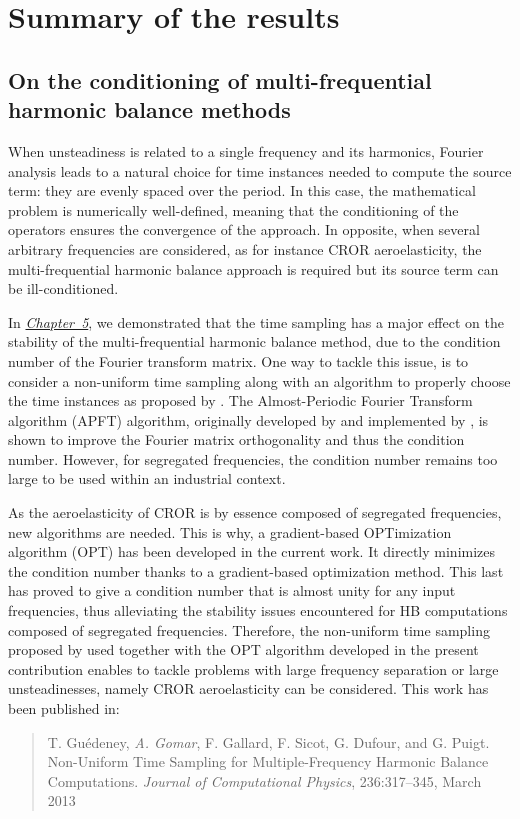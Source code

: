 \section*{Summary of the results}

\subsection*{On the conditioning of multi-frequential harmonic balance methods}

When unsteadiness is related to a single frequency and its
harmonics, Fourier analysis leads to a natural choice for time instances
needed to compute the source term:
they are evenly spaced over the period. In this case, the mathematical
problem is numerically well-defined, meaning that the conditioning of
the operators ensures the convergence of the approach.
In opposite, when several arbitrary frequencies are 
considered, as for instance CROR
aeroelasticity, the multi-frequential harmonic balance approach
is required but its source term can be ill-conditioned.

In \hyperref[cha:limitations_condition_number]{\emph{Chapter~5}},
we demonstrated that the time sampling has a major effect on the
stability of the multi-frequential harmonic balance 
method, due to the condition number of the Fourier
transform matrix. One way to tackle this issue, 
is to consider a non-uniform time sampling
along with an algorithm to properly choose the time instances
as proposed by \citet{ThesisGuedeney}.
The Almost-Periodic Fourier Transform algorithm (APFT) 
algorithm, originally developed by \citet{Kundert1988} and implemented by 
\citet{ThesisGuedeney}, is shown to improve the
Fourier matrix orthogonality and thus the condition number.
However, for segregated frequencies, the condition number
remains too large to be used within an industrial context.

As the aeroelasticity of CROR is by essence
composed of segregated frequencies, new algorithms are needed.
This is why, a gradient-based OPTimization algorithm (OPT) 
has been developed in the current work.
It directly minimizes the condition number thanks to a
gradient-based optimization method. This last has proved to
give a condition number that is almost unity for any input frequencies,
thus alleviating the stability issues encountered for HB
computations composed of segregated frequencies.
Therefore, the non-uniform time sampling proposed by \citet{ThesisGuedeney}
used together with the OPT algorithm 
developed in the present contribution
enables to tackle problems with large frequency 
separation or large unsteadinesses, namely CROR aeroelasticity
can be considered.
This work has been published in:
\begin{quote}
	{\small T. Gu\'edeney, \emph{A. Gomar}, F. Gallard, F. Sicot, G. Dufour, and G. Puigt. 
	Non-Uniform Time Sampling for Multiple-Frequency Harmonic Balance Computations. 
	\emph{Journal of Computational Physics}, 236:317--345, March 2013}
\end{quote}


